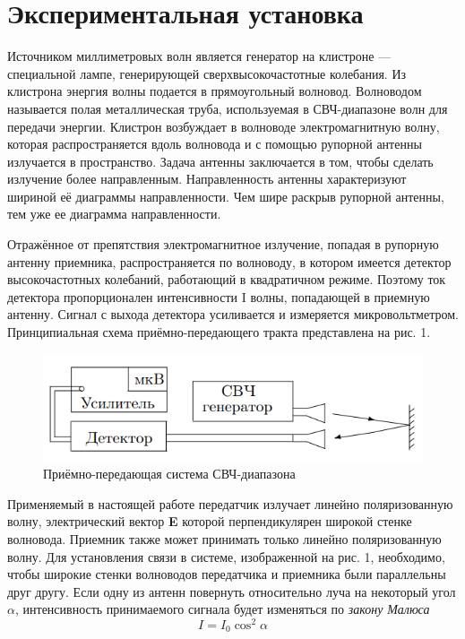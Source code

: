 \documentclass[a4paper, 12pt]{article}
\begin{document}
\section{Экспериментальная установка}
Источником миллиметровых волн является генератор на клистроне — специальной лампе, генерирующей сверхвысокочастотные колебания. Из клистрона энергия волны подается в прямоугольный волновод. Волноводом называется полая металлическая труба, используемая в СВЧ-диапазоне волн для передачи энергии. Клистрон возбуждает в волноводе
электромагнитную волну, которая распространяется вдоль волновода и с помощью рупорной антенны излучается в пространство. Задача антенны заключается в том, чтобы сделать излучение более направленным. Направленность антенны характеризуют шириной её диаграммы направленности. Чем шире раскрыв рупорной
антенны, тем уже ее диаграмма направленности. \par
Отражённое от препятствия электромагнитное излучение, попадая в рупорную антенну приемника, распространяется по волноводу, в котором имеется детектор высокочастотных колебаний,
работающий в квадратичном режиме. Поэтому ток детектора пропорционален интенсивности I волны, попадающей в приемную антенну. Сигнал с выхода детектора усиливается и измеряется микровольтметром. Принципиальная схема приёмно-передающего тракта представлена на рис. 1.

\begin{figure}[h!]
    \centering
    \includegraphics[width=12cm]{fig1.PNG}
    \caption{Приёмно-передающая система СВЧ-диапазона}
    \label{fig:vac}
\end{figure}

Применяемый в настоящей работе передатчик излучает линейно поляризованную волну, электрический вектор \textbf{E} которой перпендикулярен широкой стенке волновода. Приемник также может принимать только линейно поляризованную волну. Для установления связи в системе, изображенной на рис. 1, необходимо, чтобы широкие стенки волноводов передатчика и приемника были параллельны друг другу.
Если одну из антенн повернуть относительно луча на некоторый угол $\alpha$, интенсивность принимаемого сигнала будет изменяться по \textit{закону Малюса}
\begin{equation}
    I = I_0 \cos^2 \alpha
\end{equation}
\end{document}
